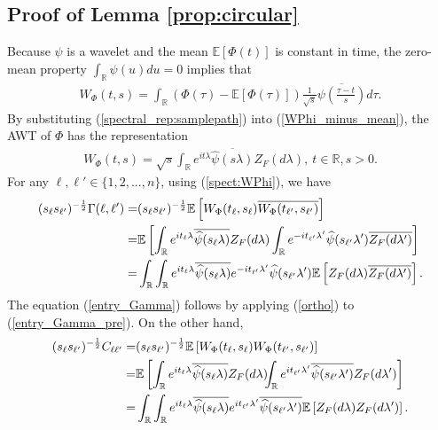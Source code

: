\documentclass{amsart}
\begin{document}
\subsection{Proof of Lemma \ref{prop:circular}}\label{sec:proof:prop:circular}
Because $\psi$ is a wavelet and the mean $\mathbb{E}[\Phi(t)]$ is constant in time,
the zero-mean property $\int_{\mathbb{R}}\psi(u)du=0$ implies that
\begin{align}\label{WPhi_minus_mean}
W_{\Phi}(t,s)=\int_{\mathbb{R}}\left(\Phi(\tau)-\mathbb{E}[\Phi(\tau)]\right)\frac{1}{\sqrt{s}}\overline{\psi\left(\frac{\tau-t}{s}\right)}d\tau.
\end{align}
By substituting (\ref{spectral_rep:samplepath}) into (\ref{WPhi_minus_mean}),
the AWT of $\Phi$ has the representation
\begin{align}\label{spect:WPhi}
W_{\Phi}(t,s) = \sqrt{s}\int_{\mathbb{R}}e^{it\lambda} \overline{\widehat{\psi}(s\lambda)}Z_{F}(d\lambda),\ t\in \mathbb{R},s>0.
\end{align}
For any $\ell,\ell'\in\{1,2,...,n\}$,
using (\ref{spect:WPhi}), we have
\begin{align}\notag
(s_{\ell}s_{\ell'})^{-\frac{1}{2}}\Gamma(\ell,\ell')
=& (s_{\ell}s_{\ell'})^{-\frac{1}{2}}\mathbb{E}\left[W_{\Phi}(t_{\ell},s_{\ell})\overline{W_{\Phi}(t_{\ell'},s_{\ell'})}\right]
\\\notag=&\mathbb{E}\left[\int_{\mathbb{R}} e^{it_{\ell}\lambda} \overline{\widehat{\psi}(s_{\ell}\lambda)} Z_{F}(d\lambda)\int_{\mathbb{R}} e^{-it_{\ell'}\lambda'} \widehat{\psi}(s_{\ell'}\lambda') \overline{Z_{F}(d\lambda')}\right]
\\\label{entry_Gamma_pre}=&
\int_{\mathbb{R}}\int_{\mathbb{R}} e^{it_{\ell}\lambda} \overline{\widehat{\psi}(s_{\ell}\lambda)}  e^{-it_{\ell'}\lambda'} \widehat{\psi}(s_{\ell'}\lambda') \mathbb{E}\left[Z_{F}(d\lambda)\overline{Z_{F}(d\lambda')}\right].
\end{align}
The equation (\ref{entry_Gamma}) follows by applying (\ref{ortho}) to (\ref{entry_Gamma_pre}).
On the other hand,
\begin{align}\notag
(s_{\ell}s_{\ell'})^{-\frac{1}{2}}C_{\ell\ell'}
=&(s_{\ell}s_{\ell'})^{-\frac{1}{2}}\mathbb{E}\left[W_{\Phi}(t_{\ell},s_{\ell})W_{\Phi}(t_{\ell'},s_{\ell'})\right]
\\\notag=&\mathbb{E}\left[\int_{\mathbb{R}} e^{it_{\ell}\lambda} \overline{\widehat{\psi}(s_{\ell}\lambda)} Z_{F}(d\lambda)\hspace{-0.15cm}\int_{\mathbb{R}} e^{it_{\ell'}\lambda'} \overline{\widehat{\psi}(s_{\ell'}\lambda')} Z_{F}(d\lambda')\right]
\\\label{entry_pseudoC_pre}=&
\int_{\mathbb{R}}\int_{\mathbb{R}} e^{it_{\ell}\lambda} \overline{\widehat{\psi}(s_{\ell}\lambda)}  e^{it_{\ell'}\lambda'} \overline{\widehat{\psi}(s_{\ell'}\lambda')} \mathbb{E}\left[Z_{F}(d\lambda)Z_{F}(d\lambda')\right].
\end{align}
\end{document}
